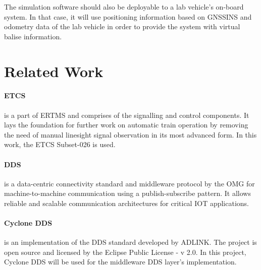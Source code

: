 \documentclass[a4paper, 12pt]{scrartcl}
\begin{document}
The simulation software should also be deployable to a lab vehicle's on-board system.
In that case, it will use positioning information based on \ac{GNSSINS} and odometry data of the lab vehicle in order to provide the system with virtual balise information.

\section*{Related Work}
\paragraph{\ac{ETCS}} is a part of \ac{ERTMS} and comprises of the signalling and control components.
It lays the foundation for further work on automatic train operation by removing the need of manual linesight signal observation in its most advanced form.
In this work, the \ac{ETCS} Subset-026 is used.
\vspace{-0.4cm}
\paragraph{\ac{DDS}} is a data-centric connectivity standard and middleware protocol by the \ac{OMG} for machine-to-machine communication using a publish-subscribe pattern.
It allows reliable and scalable communication architectures for critical \ac{IOT} applications.
\vspace{-0.4cm}
\paragraph{Cyclone DDS} is an implementation of the \ac{DDS} standard developed by ADLINK.
The project is open source and licensed by the Eclipse Public License - v 2.0.
In this project, Cyclone DDS will be used for the middleware \ac{DDS} layer's implementation.
\end{document}
